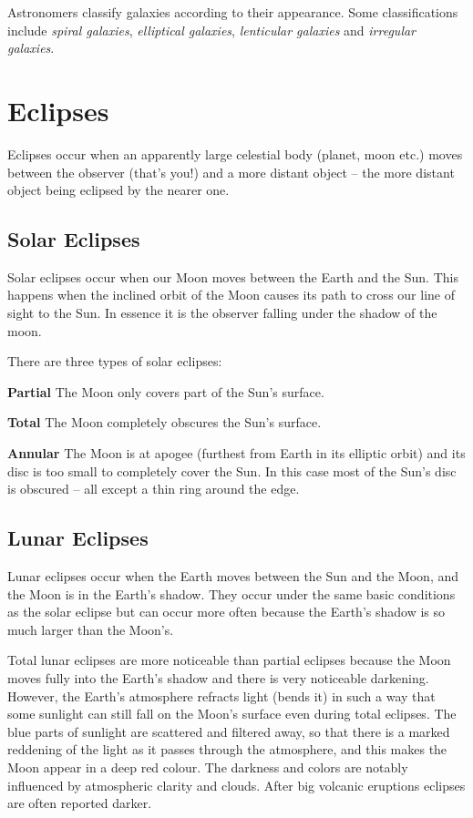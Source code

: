 Astronomers classify galaxies according to their appearance. Some
classifications include \emph{spiral galaxies}, \emph{elliptical
galaxies}, \emph{lenticular galaxies} and \emph{irregular galaxies}.



\section{Eclipses}
\label{sec:Eclipses}

Eclipses occur when an apparently large celestial body (planet, moon
etc.) moves between the observer (that's you!) and a more distant object
-- the more distant object being eclipsed by the nearer one.

\subsection{Solar Eclipses}
\label{sec:Eclipses:solar}

Solar eclipses occur when our Moon moves between the Earth and the Sun.
This happens when the inclined orbit of the Moon causes its path to
cross our line of sight to the Sun. In essence it is the observer
falling under the shadow of the moon.

There are three types of solar eclipses:

\textbf{Partial} The Moon only covers part of the Sun's surface.

\textbf{Total} The Moon completely obscures the Sun's surface.

\textbf{Annular} The Moon is at apogee (furthest from Earth in its
elliptic orbit) and its disc is too small to completely cover the Sun.
In this case most of the Sun's disc is obscured -- all except a thin ring
around the edge.

\subsection{Lunar Eclipses}
\label{sec:Eclipses:lunar}

Lunar eclipses occur when the Earth moves between the Sun and the Moon,
and the Moon is in the Earth's shadow. They occur under the same basic
conditions as the solar eclipse but can occur more often because the
Earth's shadow is so much larger than the Moon's.

Total lunar eclipses are more noticeable than partial eclipses because
the Moon moves fully into the Earth's shadow and there is very
noticeable darkening. However, the Earth's atmosphere refracts light
(bends it) in such a way that some sunlight can still fall on the Moon's
surface even during total eclipses. The blue parts of sunlight are scattered and filtered away, 
so that there is a marked reddening of the light as it passes through the atmosphere, and this 
makes the Moon appear in a deep red colour. The darkness and colors are notably influenced by 
atmospheric clarity and clouds. After big volcanic eruptions eclipses are often reported darker.



